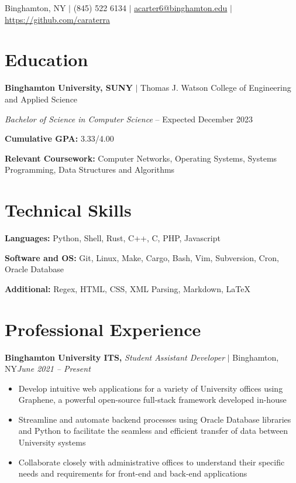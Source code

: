 \documentclass[8pt]{extarticle}
\author{Alexander Carter}
\newcommand{\jobentry}[4]{\textbf{#1,} \textit{#2} \(|\) #3\hfill \textit{#4}}
\renewcommand{\maketitle}{\begin{center}\Huge\theauthor\end{center}\vspace{.5em}}
\begin{document}
\maketitle

\begin{center}
  Binghamton, NY
  \(|\)
  (845) 522 6134
  \(|\)
  \href{mailto://acarter6@binghamton.edu}{acarter6@binghamton.edu}
  \(|\)
  \href{https://github.com/caraterra}{https://github.com/caraterra}
\end{center}

\section{Education}

\textbf{Binghamton University, SUNY} \(|\) Thomas J. Watson College of Engineering and Applied Science

\textit{Bachelor of Science in Computer Science} -- Expected December 2023

\textbf{Cumulative GPA:} 3.33/4.00

\textbf{Relevant Coursework:} Computer Networks, Operating Systems, Systems Programming, Data Structures and Algorithms

\section{Technical Skills}

\textbf{Languages:} Python, Shell, Rust, C++, C, PHP, Javascript

\textbf{Software and OS:} Git, Linux, Make, Cargo, Bash, Vim, Subversion, Cron, Oracle Database

\textbf{Additional:} Regex, HTML, CSS, XML Parsing, Markdown, {\LaTeX}

\section{Professional Experience}

\jobentry{Binghamton University ITS}{Student Assistant Developer}{Binghamton, NY}{June 2021 -- Present}

\begin{itemize}
  \item{Develop intuitive web applications for a variety of University offices using Graphene, a powerful open-source full-stack framework developed in-house}
  \item{Streamline and automate backend processes using Oracle Database libraries and Python to facilitate the seamless and efficient transfer of data between University systems}
  \item{Collaborate closely with administrative offices to understand their specific needs and requirements for front-end and back-end applications}
\end{itemize}
\end{document}
